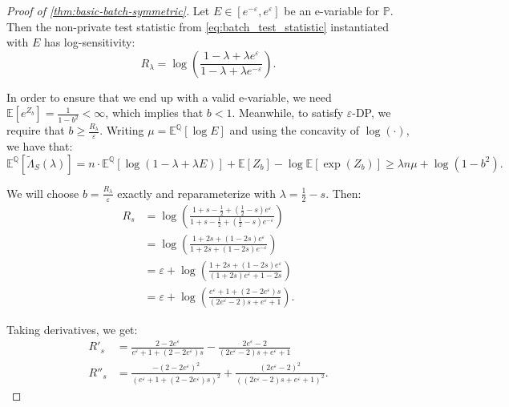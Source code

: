 \documentclass{article}
\newcommand{\Null}{\mathbb{P}}
\newcommand{\E}{\mathbb{E}}
\newcommand{\Alt}{\mathbb{Q}}
\newcommand{\eps}{\varepsilon}
\begin{document}
\begin{proof}[Proof of \cref{thm:basic-batch-symmetric}]
Let $E \in [e^{-\eps}, e^\eps]$ be an e-variable for $\Null$. Then
the non-private test statistic from \cref{eq:batch_test_statistic} instantiated with $E$ has log-sensitivity:
    \begin{equation*}
        R_\lambda = \log \left( \frac{1-\lambda+\lambda e^{\varepsilon}}{1-\lambda+\lambda e^{-\varepsilon}} \right).
    \end{equation*}

In order to ensure that we end up with a valid e-variable, we need $\mathbb{E}[e^{Z_b}] = \frac{1}{1-b^2} < \infty$, which implies that $b < 1$. Meanwhile, to satisfy $\varepsilon$-DP, we require that $b \geq \frac{R_\lambda}{\varepsilon}$. Writing $\mu = \E^\Alt[\log E]$ and using the concavity of $\log(\cdot)$, we have that:
    \begin{equation*}
        \mathbb{E}^\Alt[\tilde \Lambda_S(\lambda)] = n \cdot\mathbb{E}^\Alt[\log(1-\lambda+\lambda E)] + \mathbb{E}[Z_b] - \log \mathbb{E}[\exp(Z_b)] \geq \lambda n \mu + \log (1-b^2).
    \end{equation*}

    We will choose $b = \frac{R_\lambda}{\varepsilon}$ exactly and reparameterize with $\lambda = \frac{1}{2} - s$. Then:
    \begin{align*}
        R_s &= \log \left( \frac{1 + s - \frac{1}{2} + (\frac{1}{2}-s)e^\varepsilon}{1 + s - \frac{1}{2} + (\frac{1}{2}-s)e^{-\varepsilon}} \right) \\
        &= \log \left( \frac{1 + 2s + (1-2s)e^\varepsilon}{1 + 2s + (1-2s)e^{-\varepsilon}} \right) \\
        &= \varepsilon+ \log \left( \frac{1 + 2s + (1-2s)e^\varepsilon}{(1 + 2s)e^\varepsilon + 1-2s} \right) \\
        &= \varepsilon+ \log \left( \frac{e^\varepsilon+1 + (2-2e^\varepsilon)s}{(2e^\varepsilon-2)s + e^\varepsilon+1} \right).
    \end{align*}

    Taking derivatives, we get:
    \begin{align*}
        R'_s &= \frac{2-2e^\varepsilon}{e^\varepsilon+1+(2-2e^\varepsilon)s} - \frac{2e^\varepsilon-2}{(2e^\varepsilon-2)s+e^\varepsilon+1} \\
        R''_s &= \frac{-(2-2e^\varepsilon)^2}{(e^\varepsilon+1+(2-2e^\varepsilon)s)^2} + \frac{(2e^\varepsilon-2)^2}{((2e^\varepsilon-2)s+e^\varepsilon+1)^2}.
    \end{align*}


\end{proof}
\end{document}
